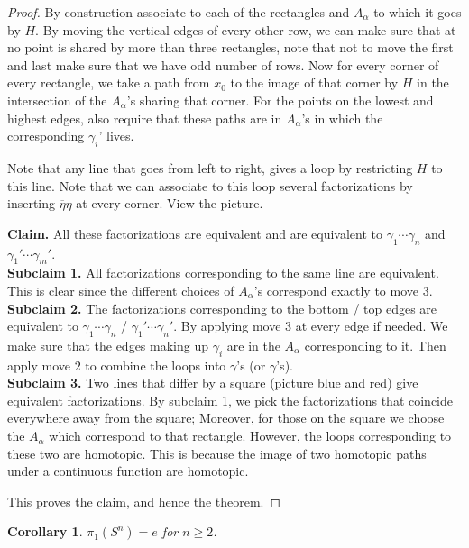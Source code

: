 \documentclass[11pt,a4paper]{article}
\theoremstyle{definition}
\theoremstyle{plain}
\newtheorem{corollary}[definition]{Corollary}
\theoremstyle{remark}
\newcommand{\1}{\mathbbm{1}}
\begin{document}
\begin{proof}
    By construction associate to each of the rectangles and $A_\alpha$ to which it goes by $H$. By moving the vertical edges of every other row, we can make sure 
    that at no point is shared by more than three rectangles, note that not to move the first and last make sure that we have odd number of rows. Now for every corner 
    of every rectangle, we take a path from $x_0$ to the image of that corner by $H$ in the intersection of the $A_\alpha$'s sharing that corner. For the points on the 
    lowest and highest edges, also require that these paths are in $A_\alpha$'s in which the corresponding $\gamma_i$' lives. 

    Note that any line that goes from left to right, gives  a loop by restricting $H$ to this line. Note that we can associate to this loop several 
    factorizations by inserting $\overline{\eta} \eta$ at every corner. View the picture. 

    \textbf{Claim.} All these factorizations are equivalent and are equivalent to $\gamma_1 \cdots \gamma_n$ and $\gamma_1' \cdots \gamma_m'$. \\
    \textbf{Subclaim 1.} All factorizations corresponding to the same line are equivalent. This is clear since the different choices of $A_\alpha$'s correspond 
    exactly to move $3$. \\
    \textbf{Subclaim 2.} The factorizations corresponding to the bottom / top edges are equivalent to $\gamma_1 \cdots \gamma_n$ / $\gamma_1' \cdots \gamma_n'$. By applying 
    move $3$ at every edge if needed. We make sure that the edges making up $\gamma_i$ are in the $A_\alpha$ corresponding to it. Then apply move $2$ to combine the loops into 
    $\gamma$'s (or $\gamma$'s). \\
    \textbf{Subclaim 3.} Two lines that differ by a square (picture blue and red) give equivalent factorizations. By subclaim 1, we pick the factorizations that 
    coincide everywhere away from the square; Moreover, for those on the square we choose the $A_\alpha$ which correspond to that rectangle. However, the loops corresponding to 
    these two are homotopic. This is because the image of two homotopic paths under a continuous function are homotopic. 
    
    This proves the claim, and hence the theorem.
\end{proof}

\begin{corollary}
    $\pi_1 (S^n) = e$ for $n \ge 2$.
\end{corollary}
\end{document}
